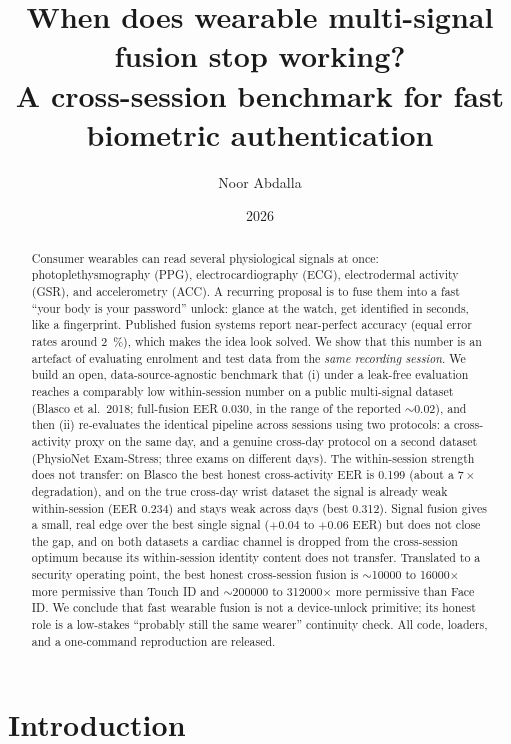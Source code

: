 \documentclass[11pt]{article}
\title{\textbf{When does wearable multi-signal fusion stop working?\\
A cross-session benchmark for fast biometric authentication}}
\author{Noor Abdalla}
\affil{\small Independent researcher \quad\textbullet\quad
\texttt{\href{https://github.com/noorabdalla04/wearable-fusion-auth-benchmark}{github.com/noorabdalla04/wearable-fusion-auth-benchmark}}}
\date{2026}
\begin{document}
\maketitle

\begin{abstract}
\noindent
Consumer wearables can read several physiological signals at once: photoplethysmography
(PPG), electrocardiography (ECG), electrodermal activity (GSR), and accelerometry (ACC). A
recurring proposal is to fuse them into a fast ``your body is your password'' unlock:
glance at the watch, get identified in seconds, like a fingerprint. Published fusion systems
report near-perfect accuracy (equal error rates around \SI{2}{\percent}), which makes the
idea look solved. We show that this number is an artefact of evaluating enrolment and test
data from the \emph{same recording session}. We build an open, data-source-agnostic benchmark
that (i) under a leak-free evaluation reaches a comparably low within-session number on a
public multi-signal dataset (Blasco et al.\ 2018; full-fusion EER \num{0.030}, in the range of
the reported ${\sim}0.02$), and
then (ii) re-evaluates the identical pipeline across sessions using two protocols: a
cross-activity proxy on the same day, and a genuine cross-day protocol on a second dataset
(PhysioNet Exam-Stress; three exams on different days). The within-session strength does not
transfer: on Blasco the best honest cross-activity EER is \num{0.199} (about a $7\times$
degradation), and on the true cross-day wrist dataset the signal is already weak within-session
(EER \num{0.234}) and stays weak across days (best \num{0.312}). Signal fusion gives a small,
real edge over the best single signal ($+0.04$ to $+0.06$ EER) but does not close the gap, and
on both datasets a cardiac channel is dropped from the cross-session optimum because its
within-session identity content does not transfer. Translated to a security operating point, the best
honest cross-session fusion is ${\sim}$\num{10000} to \num{16000}$\times$ more permissive than
Touch ID and ${\sim}$\num{200000} to \num{312000}$\times$ more permissive than Face ID. We
conclude that fast wearable fusion is not a device-unlock primitive; its honest role is a
low-stakes ``probably still the same wearer'' continuity check. All code, loaders, and a
one-command reproduction are released.
\end{abstract}

\section{Introduction}
\label{sec:intro}
\end{document}
